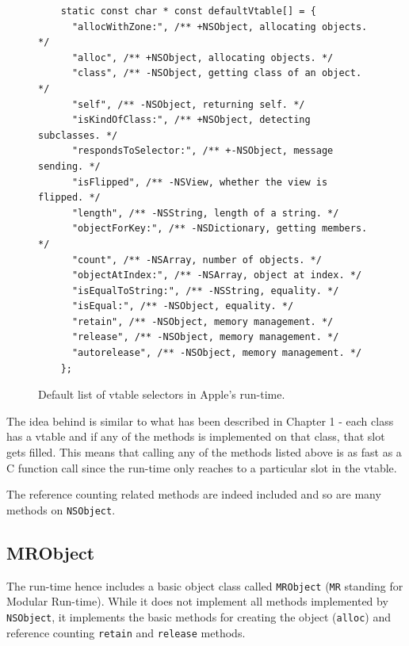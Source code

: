 \begin{figure}[H]
  \begin{verbatim}
    static const char * const defaultVtable[] = {
      "allocWithZone:", /** +NSObject, allocating objects. */
      "alloc", /** +NSObject, allocating objects. */
      "class", /** -NSObject, getting class of an object. */
      "self", /** -NSObject, returning self. */
      "isKindOfClass:", /** +NSObject, detecting subclasses. */
      "respondsToSelector:", /** +-NSObject, message sending. */
      "isFlipped", /** -NSView, whether the view is flipped. */
      "length", /** -NSString, length of a string. */
      "objectForKey:", /** -NSDictionary, getting members. */
      "count", /** -NSArray, number of objects. */
      "objectAtIndex:", /** -NSArray, object at index. */
      "isEqualToString:", /** -NSString, equality. */
      "isEqual:", /** -NSObject, equality. */
      "retain", /** -NSObject, memory management. */
      "release", /** -NSObject, memory management. */ 
      "autorelease", /** -NSObject, memory management. */
    };
  \end{verbatim}
  \centering{}
  \caption{Default list of vtable selectors in Apple's run-time.}
  \label{fig:vtable_def_sels}
\end{figure}

The idea behind is similar to what has been described in Chapter 1 - each class has a vtable and if any of the methods is implemented on that class, that slot gets filled. This means that calling any of the methods listed above is as fast as a C function call since the run-time only reaches to a particular slot in the vtable.

The reference counting related methods are indeed included and so are many methods on \verb=NSObject=.

\subsection{MRObject}

The run-time hence includes a basic object class called \verb=MRObject= (\verb=MR= standing for Modular Run-time). While it does not implement all methods implemented by \verb=NSObject=, it implements the basic methods for creating the object (\verb=alloc=) and reference counting \verb=retain= and \verb=release= methods.

